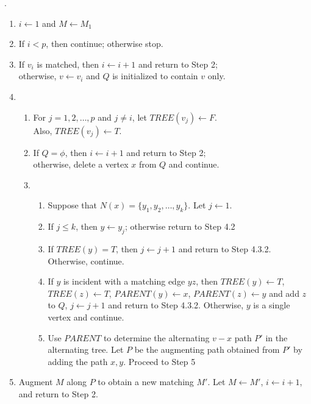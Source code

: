 \begin{algorithm}.
	\begin{enumerate}
		\item $ i \leftarrow 1$ and $M \leftarrow M_1$
		\item If $i < p$, then continue; otherwise stop.
		\item If $v_i$ is matched, then $i \leftarrow i+1$ and return to Step 2;\\
			otherwise, $v \leftarrow v_i$ and $Q$ is initialized to contain $v$ only.
		\item 
			\begin{enumerate}[label=(\arabic*)]
				\item For $j = 1,2,\dots,p$ and $j \ne i$, let $TREE(v_j) \leftarrow F$.\\
					Also, $TREE(v_j) \leftarrow T$.
				\item If $Q = \phi$, then $i \leftarrow i+1$ and return to Step 2;\\
					otherwise, delete a vertex $x$ from $Q$ and continue.
				\item 
					\begin{enumerate}[label=(\arabic*)]
						\item Suppose that $N(x) = \{y_1,y_2,\dots,y_k\}$.
							Let $j \leftarrow 1$.
						\item If $j \le k$, then $y \leftarrow y_j$; otherwise return to Step 4.2
						\item If $TREE(y) = T$, then $j \leftarrow j+1$ and return to Step 4.3.2. Otherwise, continue.
						\item If $y$ is incident with a matching edge $yz$, then $TREE(y) \leftarrow T$, $TREE(z) \leftarrow T$, $PARENT(y) \leftarrow x$, $PARENT(z) \leftarrow y$ and add $z$ to $Q$, $j \leftarrow j+1$ and return to Step 4.3.2. Otherwise, $y$ is a single vertex and continue.
						\item Use $PARENT$ to determine the alternating $v-x$ path $P'$ in the alternating tree.
							Let $P$ be the augmenting path obtained from $P'$ by adding the path $x,y$.
							Proceed to Step 5
					\end{enumerate}
			\end{enumerate}
		\item Augment $M$ along $P$ to obtain a new matching $M'$.
			Let $M \leftarrow M'$, $i \leftarrow i+1$, and return to Step 2.
	\end{enumerate}
	\label{alg:maxmatching}
\end{algorithm}

